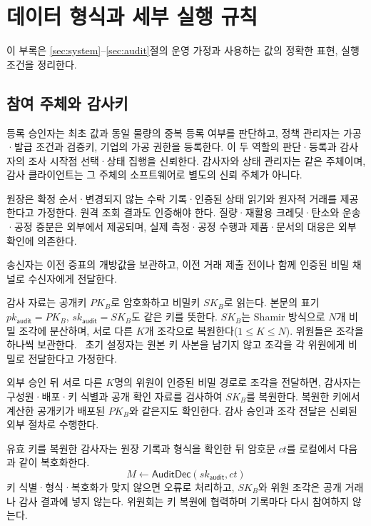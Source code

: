 \section{데이터 형식과 세부 실행 규칙}
\label{app:protocol-details}

이 부록은 \ref{sec:system}–\ref{sec:audit}절의 운영 가정과
사용하는 값의 정확한 표현, 실행 조건을 정리한다.

\subsection{참여 주체와 감사키}
\label{app:system-model}
\label{app:audit-key}

등록 승인자는 최초 값과 동일 물량의 중복 등록 여부를 판단하고,
정책 관리자는 가공·발급 조건과 검증키, 기업의 가공 권한을 등록한다.
이 두 역할의 판단·등록과 감사자의 조사 시작점 선택·상태 집행을 신뢰한다.
감사자와 상태 관리자는 같은 주체이며, 감사 클라이언트는 그 주체의
소프트웨어로 별도의 신뢰 주체가 아니다.

원장은 확정 순서·변경되지 않는 수락 기록·인증된 상태 읽기와
원자적 거래를 제공한다고 가정한다. 원격 조회 결과도 인증해야 한다.
질량·재활용 크레딧·탄소와 운송·공정 증분은 외부에서 제공되며,
실제 측정·공정 수행과 제품·문서의 대응은 외부 확인에 의존한다.

송신자는 이전 증표의 개방값을 보관하고, 이전 거래 제출 전이나 함께
인증된 비밀 채널로 수신자에게 전달한다.

감사 자료는 공개키 $PK_B$로 암호화하고 비밀키 $SK_B$로 읽는다.
본문의 표기 $pk_{\mathsf{audit}}=PK_B$,
$sk_{\mathsf{audit}}=SK_B$도 같은 키를 뜻한다.
$SK_B$는 Shamir 방식으로 $N$개 비밀 조각에 분산하며,
서로 다른 $K$개 조각으로 복원한다($1\leq K\leq N$).
위원들은 조각을 하나씩 보관한다.~\cite{shamir-secret-sharing-1979}
초기 설정자는 원본 키 사본을 남기지 않고 조각을 각 위원에게
비밀로 전달한다고 가정한다.

외부 승인 뒤 서로 다른 $K$명의 위원이 인증된 비밀 경로로 조각을 전달하면,
감사자는 구성원·배포·키 식별과 공개 확인 자료를 검사하여 $SK_B$를 복원한다.
복원한 키에서 계산한 공개키가 배포된 $PK_B$와 같은지도 확인한다.
감사 승인과 조각 전달은 신뢰된 외부 절차로 수행한다.

유효 키를 복원한 감사자는 원장 기록과 형식을 확인한 뒤
암호문 $ct$를 로컬에서 다음과 같이 복호화한다.
\begin{equation}
 M\leftarrow\mathsf{AuditDec}(sk_{\mathsf{audit}},ct)
 \label{eq:decrypt}
\end{equation}
키 식별·형식·복호화가 맞지 않으면 오류로 처리하고,
$SK_B$와 위원 조각은 공개 거래나 감사 결과에 넣지 않는다.
위원회는 키 복원에 협력하며 기록마다 다시 참여하지 않는다.

